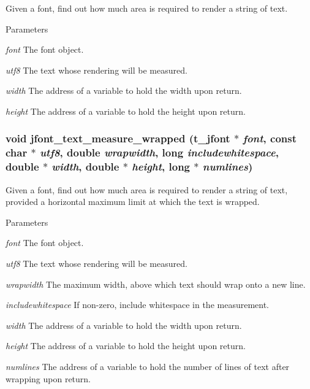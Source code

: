 Given a font, find out how much area is required to render a string of text. 
\begin{DoxyParams}{Parameters}
\item[{\em font}]The font object. \item[{\em utf8}]The text whose rendering will be measured. \item[{\em width}]The address of a variable to hold the width upon return. \item[{\em height}]The address of a variable to hold the height upon return. \end{DoxyParams}
\hypertarget{group__jfont_ga77610846a756e6da12043d016273d3aa}{
\subsubsection[{jfont\_\-text\_\-measure\_\-wrapped}]{\setlength{\rightskip}{0pt plus 5cm}void jfont\_\-text\_\-measure\_\-wrapped ({\bf t\_\-jfont} $\ast$ {\em font}, \/  const char $\ast$ {\em utf8}, \/  double {\em wrapwidth}, \/  long {\em includewhitespace}, \/  double $\ast$ {\em width}, \/  double $\ast$ {\em height}, \/  long $\ast$ {\em numlines})}}
\label{group__jfont_ga77610846a756e6da12043d016273d3aa}


Given a font, find out how much area is required to render a string of text, provided a horizontal maximum limit at which the text is wrapped. 
\begin{DoxyParams}{Parameters}
\item[{\em font}]The font object. \item[{\em utf8}]The text whose rendering will be measured. \item[{\em wrapwidth}]The maximum width, above which text should wrap onto a new line. \item[{\em includewhitespace}]If non-\/zero, include whitespace in the measurement. \item[{\em width}]The address of a variable to hold the width upon return. \item[{\em height}]The address of a variable to hold the height upon return. \item[{\em numlines}]The address of a variable to hold the number of lines of text after wrapping upon return. \end{DoxyParams}
